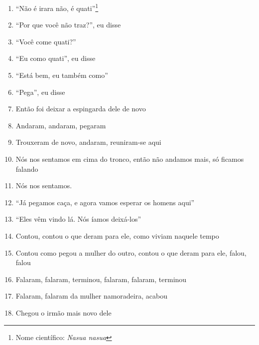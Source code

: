 \begin{enumerate}
 \item ``Não é irara não, é quati''\footnote{Nome científico: \textit{Nasua
   nasua}}

 \item ``Por que você não traz?'', eu disse

 \item ``Você come quati?''

 \item ``Eu como quati'', eu disse

 \item ``Está bem, eu também como''

 \item ``Pega'', eu disse

 \item Então foi deixar a espingarda dele de novo

 \begin{center}\end{center}

 \item Andaram, andaram, pegaram

 \item Trouxeram de novo, andaram, reuniram-se aqui

 \item Nós nos sentamos em cima do tronco, então não andamos mais, só
 ficamos falando

 \item Nós nos sentamos.

 \item ``Já pegamos caça, e agora vamos esperar os homens aqui''

 \item ``Eles vêm vindo lá. Nós íamos deixá-los''

 \item Contou, contou o que deram para ele, como viviam naquele tempo

 \item Contou como pegou a mulher do outro, contou o que deram para ele,
 falou, falou

 \item Falaram, falaram, terminou, falaram, falaram, terminou

 \item Falaram, falaram da mulher namoradeira, acabou

 \begin{center}\end{center}

 \item Chegou o irmão mais novo dele


\end{enumerate}
